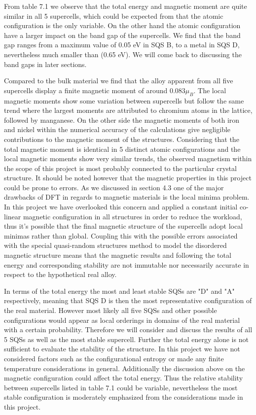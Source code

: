 From table 7.1 we observe that the total energy and magnetic moment are quite similar in all 5 supercells, which could be expected from that the atomic configuration is the only variable. On the other hand the atomic configuration have a larger impact on the band gap of the supercells. We find that the band gap ranges from a maximum value of 0.05 eV in SQS B, to a metal in SQS D, nevertheless much smaller than  (0.65 eV). We will come back to discussing the band gaps in later sections. 

Compared to the bulk material we find that the alloy apparent from all five supercells display a finite magnetic moment of around $0.083 \mu_B$. The local magnetic moments show some variation between supercells but follow the same trend where the largest moments are attributed to chromium atoms in the lattice, followed by manganese. On the other side the magnetic moments of both iron and nickel within the numerical accuracy of the calculations give negligible contributions to the magnetic moment of the structures. Considering that the total magnetic moment is identical in 5 distinct atomic configurations and the local magnetic moments show very similar trends, the observed magnetism within the scope of this project is most probably connected to the particular crystal structure. It should be noted however that the magnetic properties in this project could be prone to errors. As we discussed in section 4.3 one of the major drawbacks of DFT in regards to magnetic materials is the local minima problem. In this project we have overlooked this concern and applied a constant initial co-linear magnetic configuration in all structures in order to reduce the workload, thus it's possible that the final magnetic structure of the supercells adopt local minimas rather than global. Coupling this with the possible errors associated with the special quasi-random structures method to model the disordered magnetic structure means that the magnetic results and following the total energy and corresponding stability are not immutable nor necessarily accurate in respect to the hypothetical real alloy. 
    
In terms of the total energy the most and least stable SQSs are "D" and "A" respectively, meaning that SQS D is then the most representative configuration of the real material. However most likely all five SQSs and other possible configurations would appear as local orderings in domains of the real material with a certain probability. Therefore we will consider and discuss the results of all 5 SQSs as well as the most stable supercell. Further the total energy alone is not sufficient to evaluate the stability of the structure. In this project we have not considered factors such as the configurational entropy or made any finite temperature considerations in general. Additionally the discussion above on the magnetic configuration could affect the total energy. Thus the relative stability between supercells listed in table 7.1 could be  variable, nevertheless the most stable configuration is moderately emphasized from the considerations made in this project.
 
